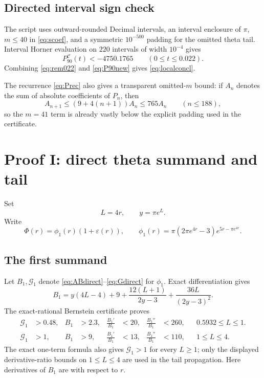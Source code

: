 \documentclass{amsart}
\numberwithin{equation}{section}
\theoremstyle{definition}
\theoremstyle{remark}
\newcommand{\Ccal}{\mathcal C}
\newcommand{\Gcal}{\mathcal G}
\begin{document}
\subsection{Directed interval sign check}
The script  uses outward-rounded Decimal intervals, an interval enclosure of $\pi$, $m\le40$ in \eqref{eq:scoef}, and a symmetric $10^{-500}$ padding for the omitted theta tail.  Interval Horner evaluation on $220$ intervals of width $10^{-4}$ gives
\begin{equation}\label{eq:P90new}
 P_{90}^{\Ccal}(t)<-4750.1765\qquad(0\le t\le0.022).
\end{equation}
Combining \eqref{eq:rem022} and \eqref{eq:P90new} gives \eqref{eq:localconcl}.

The recurrence \eqref{eq:Prec} also gives a transparent omitted-$m$ bound: if $A_n$ denotes the sum of absolute coefficients of $P_n$, then
\[
 A_{n+1}\le(9+4(n+1))A_n\le765A_n\qquad(n\le188),
\]
so the $m=41$ term is already vastly below the explicit padding used in the certificate.

\section{Proof I: direct theta summand and tail}
Set
\begin{equation}\label{eq:Lydirect}
 L=4r,\qquad y=\pi e^L.
\end{equation}
Write
\begin{equation}\label{eq:splitdirect}
 \Phi(r)=\phi_1(r)(1+\varepsilon(r)),
 \qquad
 \phi_1(r)=\pi(2\pi e^{4r}-3)e^{5r-\pi e^{4r}}.
\end{equation}

\subsection{The first summand}
Let $B_1,\Gcal_1$ denote \eqref{eq:ABdirect}--\eqref{eq:Gdirect} for $\phi_1$.  Exact differentiation gives
\begin{equation}\label{eq:B1direct}
 B_1=y(4L-4)+9+\frac{12(L+1)}{2y-3}
 +\frac{36L}{(2y-3)^2}.
\end{equation}
The exact-rational Bernstein certificate  proves
\begin{align}
 \Gcal_1&>0.48,
 &B_1&>2.3,
 &\frac{B_1'}{B_1}&<20,
 &\frac{B_1''}{B_1}&<260,
 &&0.5932\le L\le1.\label{eq:firststrong}\\
 \Gcal_1&>1,
 &B_1&>9,
 &\frac{B_1'}{B_1}&<13,
 &\frac{B_1''}{B_1}&<110,
 &&1\le L\le4.\label{eq:firstmid}
\end{align}
The exact one-term formula also gives $\Gcal_1>1$ for every $L\ge1$; only the displayed derivative-ratio bounds on $1\le L\le4$ are used in the tail propagation.  Here derivatives of $B_1$ are with respect to $r$.
\end{document}
